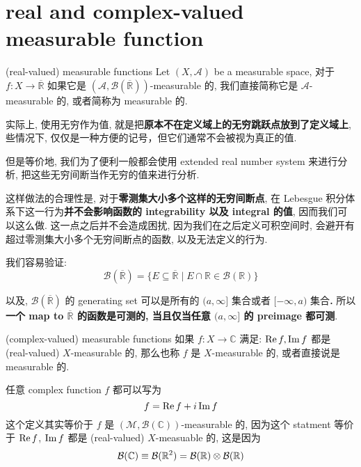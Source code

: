 \documentclass[lang=cn,11pt]{elegantbook}
\begin{document}
\section{real and complex-valued measurable function}
\begin{definition}{(real-valued) measurable functions}
Let $(X,\mathcal{A})$ be a measurable space, 
对于 $f: X \rightarrow \overline{\mathbb{R}}$ 如果它是 $(\mathcal{A}, \mathcal{B}(\overline{\mathbb{R}}))$-measurable 的, 我们直接简称它是 $\mathcal{A}$-measurable 的, 或者简称为 measurable 的.

\end{definition}
\begin{remark}
    实际上, 使用无穷作为值, 就是把\textbf{原本不在定义域上的无穷跳跃点放到了定义域上}, 些情况下, 仅仅是一种方便的记号，但它们通常不会被视为真正的值.
    
    但是等价地, 我们为了便利一般都会使用 extended real number system 来进行分析, 把这些无穷间断当作无穷的值来进行分析. 
    
    这样做法的合理性是, 对于\textbf{零测集大小多个这样的无穷间断点}, 在 Lebesgue 积分体系下这一行为\textbf{并不会影响函数的 integrability 以及 integral 的值}, 因而我们可以这么做. 这一点之后并不会造成困扰, 因为我们在之后定义可积空间时, 会避开有超过零测集大小多个无穷间断点的函数, 以及无法定义的行为.

    我们容易验证:
    $$
    \mathcal{B}(  \overline{\mathbb{R}}) = \{  E \subseteq \overline{\mathbb{R}}  \mid  E\cap \mathbb{R} \in \mathcal{B}(\mathbb{R})   \}
    $$
    
    以及, $   \mathcal{B}(  \overline{\mathbb{R}}) $ 的 generating set 可以是所有的 $(a, \infty]$ 集合或者 $[-\infty, a)$ 集合\textbf{.} 所以\textbf{一个 map to $\overline{\mathbb{R}}$ 的函数是可测的, 当且仅当任意 $ (a, \infty]$ 的 preimage 都可测}.\\
    \end{remark}


\begin{definition}{(complex-valued) measurable functions}
    如果 $f: X \rightarrow \mathbb{C}$ 满足: $\operatorname{Re} f, \operatorname{Im} f$ 都是 (real-valued) $X$-measurable 的, 那么也称 $f$ 是 $X$-measurable 的, 或者直接说是 measurable 的.
\end{definition}
\begin{remark}
    任意 complex function $f$ 都可以写为
$$
    f = \operatorname{Re} f + i \operatorname{Im} f
    $$
    这个定义其实等价于 $f$ 是 $(\mathcal{M}, \mathcal{B}(\mathbb{C}))$-measurable 的, 因为这个 statment 等价于 $\operatorname{Re} f$, $\operatorname{Im} f$ 都是 (real-valued) $X$-measuable 的, 这是因为 $$\mathcal{B}(\mathbb{C}) \equiv \mathcal{B}(\mathbb{R}^2) = \mathcal{B}(\mathbb{R}) \otimes \mathcal{B}(\mathbb{R})$$
\end{remark}
\end{document}

